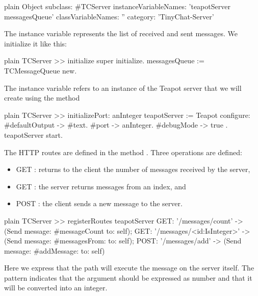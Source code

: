 \documentclass[10pt,twoside,english]{_support/latex/sbabook/sbabook}
\begin{document}
\begin{displaycode}{plain}
Object subclass: #TCServer
	instanceVariableNames: 'teapotServer messagesQueue'
	classVariableNames: ''
	category: 'TinyChat-Server'
\end{displaycode}

The instance variable  represents the list of received and sent messages.
We initialize it like this:

\begin{displaycode}{plain}
TCServer >> initialize
	super initialize.
	messagesQueue := TCMessageQueue new.
\end{displaycode}

The instance variable  refers to an instance of the Teapot server that we will create using the method 

\begin{displaycode}{plain}
TCServer >> initializePort: anInteger
	teapotServer := Teapot configure: { 
		#defaultOutput -> #text.
		#port -> anInteger.
		#debugMode -> true
	}.
	teapotServer start.
\end{displaycode}

The HTTP routes are defined in the method . Three operations are defined: 

\begin{itemize}
\item GET : returns to the client the number of messages received by the server, 
\item GET : the server returns messages from an index, and
\item POST : the client sends a new message to the server.
\end{itemize}

\begin{displaycode}{plain}
TCServer >> registerRoutes
	teapotServer
		GET: '/messages/count' -> (Send message: #messageCount to: self);
		GET: '/messages/<id:IsInteger>' -> (Send message: #messagesFrom: to: self);
		POST: '/messages/add' -> (Send message: #addMessage: to: self)
\end{displaycode}

Here we express that the path  will execute the message  on the server itself.
The pattern  indicates that the argument should be expressed as number and that it will be converted
into an integer. 
\end{document}
